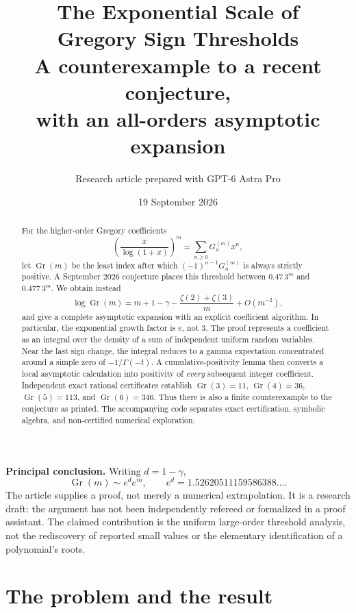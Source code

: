 \documentclass[11pt]{article}
\title{\color{Ink}\bfseries The Exponential Scale of\protect\\ Gregory Sign Thresholds\protect\\[5pt]
\large A counterexample to a recent conjecture,\protect\\ with an all-orders asymptotic expansion}
\author{Research article prepared with GPT-6 Astra Pro}
\date{19 September 2026}
\numberwithin{equation}{section}
\theoremstyle{definition}
\newcommand{\Gr}{\operatorname{Gr}}
\begin{document}
\maketitle
\begin{abstract}
For the higher-order Gregory coefficients
\[
 \left(\frac{x}{\log(1+x)}\right)^m=\sum_{n\ge0}G_n^{(m)}x^n,
\]
let $\Gr(m)$ be the least index after which
$(-1)^{n-1}G_n^{(m)}$ is always strictly positive. A September 2026
conjecture places this threshold between $0.47\,3^m$ and $0.477\,3^m$.
We obtain instead
\[
 \log\Gr(m)=m+1-\gamma-\frac{\zeta(2)+\zeta(3)}{m}+O(m^{-2}),
\]
and give a complete asymptotic expansion with an explicit coefficient
algorithm. In particular, the exponential growth factor is $e$, not $3$.
The proof represents a coefficient as an integral over the density of a
sum of independent uniform random variables. Near the last sign change,
the integral reduces to a gamma expectation concentrated around a simple
zero of $-1/\Gamma(-t)$. A cumulative-positivity lemma then converts a local
asymptotic calculation into positivity of \emph{every} subsequent integer
coefficient. Independent exact rational certificates establish
$\Gr(3)=11$, $\Gr(4)=36$, $\Gr(5)=113$, and $\Gr(6)=346$.
Thus there is also a finite counterexample to the conjecture as printed.
The accompanying code separates exact certification, symbolic algebra,
and non-certified numerical exploration.
\end{abstract}

\begin{resultbox}
\textbf{Principal conclusion.}
Writing $d=1-\gamma$,
\[
 \boxed{\Gr(m)\sim e^d e^m,\qquad e^d=1.52620511159586388\ldots .}
\]
The article supplies a proof, not merely a numerical extrapolation.
It is a research draft: the argument has not been independently refereed
or formalized in a proof assistant. The claimed contribution is the
uniform large-order threshold analysis, not the rediscovery of reported
small values or the elementary identification of a polynomial's roots.
\end{resultbox}

\section{The problem and the result}\label{sec:intro}
\end{document}
